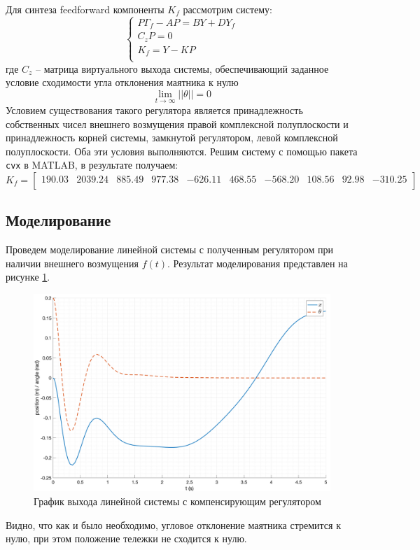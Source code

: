 Для синтеза feedforward компоненты $K_f$ рассмотрим систему:
\begin{equation}
    \begin{cases}
        P\Gamma_f - AP = BY + DY_f \\ 
        C_z P = 0 \\ 
        K_f = Y - K P \\ 
    \end{cases}
\end{equation}
где $C_z$ -- матрица виртуального выхода системы, обеспечивающий заданное условие 
сходимости угла отклонения маятника к нулю
\begin{equation}
    \lim_{t\to\infty} ||\theta|| = 0
\end{equation}
Условием существования такого регулятора является принадлежность собственных чисел 
внешнего возмущения правой комплексной полуплоскости и принадлежность корней 
системы, замкнутой регулятором, левой комплексной полуплоскости. Оба эти условия выполняются. 
Решим систему с помощью пакета \texttt{cvx} в MATLAB, в результате получаем:
\begin{equation}
    K_f = \begin{bmatrix}
190.03  & 2039.24  & 885.49  & 977.38  & -626.11  & 468.55  & -568.20  & 108.56  & 92.98  & -310.25 \\
    \end{bmatrix}
\end{equation}

\subsection{Моделирование}
Проведем моделирование линейной системы с полученным регулятором при наличии внешнего возмущения $f(t)$. 
Результат моделирования представлен на рисунке \ref{fig:compensation_lin}. 
\begin{figure}[ht!]
    \centering
    \includegraphics[width=\textwidth]{media/plots/compensation/linear_out_1.png}
    \caption{График выхода линейной системы с компенсирующим регулятором}
    \label{fig:compensation_lin}
\end{figure}
Видно, что как и было необходимо, угловое отклонение маятника стремится к нулю, при этом 
положение тележки не сходится к нулю. 

